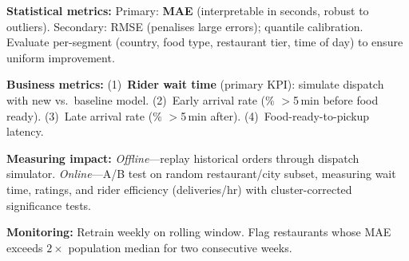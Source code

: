 \documentclass[11pt,a4paper]{article}
\begin{document}
\textbf{Statistical metrics:} Primary: \textbf{MAE} (interpretable in seconds, robust to outliers). Secondary: RMSE (penalises large errors); quantile calibration. Evaluate per-segment (country, food type, restaurant tier, time of day) to ensure uniform improvement.

\textbf{Business metrics:} (1)~\textbf{Rider wait time} (primary KPI): simulate dispatch with new vs.\ baseline model. (2)~Early arrival rate (\% $>$5\,min before food ready). (3)~Late arrival rate (\% $>$5\,min after). (4)~Food-ready-to-pickup latency.

\textbf{Measuring impact:} \textit{Offline}---replay historical orders through dispatch simulator. \textit{Online}---A/B test on random restaurant/city subset, measuring wait time, ratings, and rider efficiency (deliveries/hr) with cluster-corrected significance tests.

\textbf{Monitoring:} Retrain weekly on rolling window. Flag restaurants whose MAE exceeds $2\times$ population median for two consecutive weeks.
\end{document}
